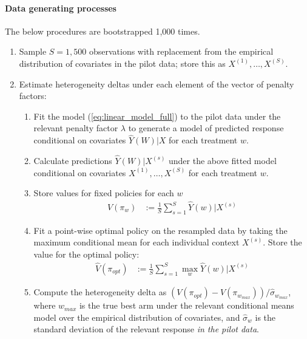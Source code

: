 \documentclass[letterpaper, 12pt, parskip=full,DIV=10]{scrartcl}
\begin{document}
\paragraph{Data generating processes} 
The below procedures are bootstrapped 1,000 times. 
\begin{enumerate}
\item  Sample $S=1,500$ observations with replacement from the empirical distribution of covariates in the pilot data; store this as $X^{(1)}, \dots,X^{(S)}$. 
\item Estimate heterogeneity deltas under each element of the vector of penalty factors:
\begin{enumerate}
\item Fit the model (\ref{eq:linear_model_full}) to the pilot data under the relevant penalty factor $\lambda$ to generate a model of predicted response conditional on covariates $\hat{Y}(W) | X$ for each treatment $w$.
  \item Calculate predictions $\hat{Y}(W) | X^{(s)}$ under the above fitted model conditional on covariates $X^{(1)}, \dots,X^{(S)}$ for each treatment $w$. 
  \item Store values for fixed policies for each $w$
      \begin{align}
          \hat{V}({\pi}_{w})  &:= \frac{1}{S} \sum_{s = 1}^S \hat{Y}(w) | X^{(s)}  
          \end{align}
  \item Fit a point-wise optimal policy on the resampled data by taking the maximum conditional mean for each individual context $X^{(s)}$. Store the value for the optimal policy:
    \begin{align}
      \hat{V}({\pi}_{opt})  &:= \frac{1}{S} \sum_{s = 1}^S \max_{ w } \hat{Y}(w) | X^{(s)}
          \end{align}
  \item Compute the heterogeneity delta as $\left({V}({\pi}_{opt})-{V}({\pi}_{w_{max}})\right)/\hat\sigma_{w_{max}}$, where $w_{max}$ is the true best arm under the relevant conditional means model over the empirical distribution of covariates, and $\hat\sigma_{w}$ is the standard deviation of the relevant response \textit{in the pilot data}. 

\end{enumerate}
\end{enumerate}
\end{document}
